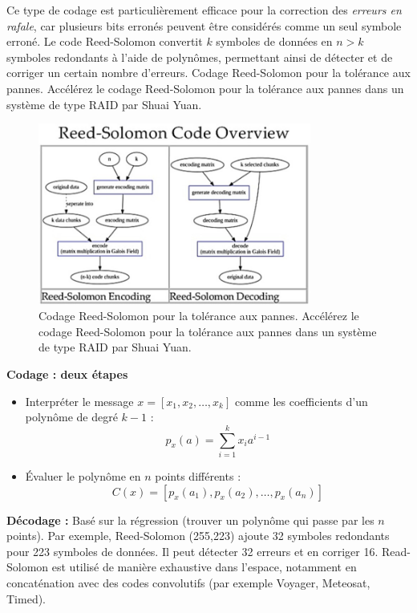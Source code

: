 Ce type de codage est particulièrement efficace pour la correction des \textit{erreurs en rafale}, car plusieurs bits erronés peuvent être considérés comme un seul symbole erroné.  
Le code Reed-Solomon convertit $k$ symboles de données en $n > k$ symboles redondants à l'aide de polynômes, permettant ainsi de détecter et de corriger un certain nombre d'erreurs.
Codage Reed-Solomon pour la tolérance aux pannes. Accélérez le codage Reed-Solomon pour la tolérance aux pannes dans un système de type RAID par Shuai Yuan.
\begin{figure}[H] %
    \centering
    \includegraphics[width=0.8\textwidth]{figures/6-29.jpg}
    
    \caption{Codage Reed-Solomon pour la tolérance aux pannes. Accélérez le codage Reed-Solomon pour la tolérance aux pannes dans un système de type RAID par Shuai Yuan.}
    \label{fig:communication2}
\end{figure}
\textbf{Codage : deux étapes}
\begin{itemize}
    \item Interpréter le message $x = [x_1, x_2, \dots, x_k]$ comme les coefficients d'un polynôme de degré $k - 1$ :
    \[
    p_x(a) = \sum_{i=1}^{k} x_i a^{i-1}
    \]
    
    \item Évaluer le polynôme en $n$ points différents :
    \[
    C(x) = [p_x(a_1), p_x(a_2), \dots, p_x(a_n)]
    \]
\end{itemize}
\textbf{Décodage :} Basé sur la régression (trouver un polynôme qui passe par les $n$ points).
Par exemple, Reed-Solomon (255,223) ajoute 32 symboles redondants pour 223 symboles de données. Il peut détecter 32 erreurs et en corriger 16. Read-Solomon est utilisé de manière exhaustive dans l'espace, notamment en concaténation avec des codes convolutifs (par exemple Voyager, Meteosat, Timed).
